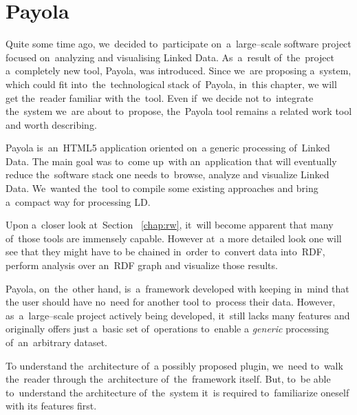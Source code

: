 \chapter{Payola}
\label{ch:payola}

Quite some time ago, we~decided to~participate on~a~large--scale software 
project focused on~analyzing and visualising Linked Data. As~a~result of~the~project
a~completely new tool, Payola, was introduced. Since we~are proposing a~system, which could fit into~the~technological stack of~Payola, in~this chapter, 
we will get the~reader familiar with the~tool. Even if~we  decide 
not to~integrate the~system we~are about to~propose, the~Payola tool remains
a related work tool and worth describing.

Payola is~an~HTML5 application oriented on~a generic processing of~Linked Data. 
The main goal was to~come up~with an~application that will eventually reduce the~software 
stack one needs to~browse, analyze and visualize Linked Data. We~wanted the~tool 
to compile some existing approaches and bring a~compact way for processing LD.

Upon a~closer look at~Section ~\ref{chap:rw}, it~will become apparent that many of~those tools are
immensely capable. However at~a more detailed look one will see that they might have to
be chained in~order to~convert data into~RDF, perform analysis over an~RDF graph and visualize those results.

Payola, on~the~other hand, is~a~framework developed with keeping in~mind that 
the user should have no~need for another tool to~process their data. However, as~a~large--scale project actively being developed, it~still lacks many 
features and originally offers just a~basic set of~operations to~enable a
\emph{generic} processing of~an~arbitrary dataset.

To understand the~architecture of~a possibly proposed plugin, we~need to~walk the~reader 
through the~architecture of~the~framework itself. But, to~be able to~understand 
the architecture of~the~system it~is required to~familiarize oneself with its features first.

